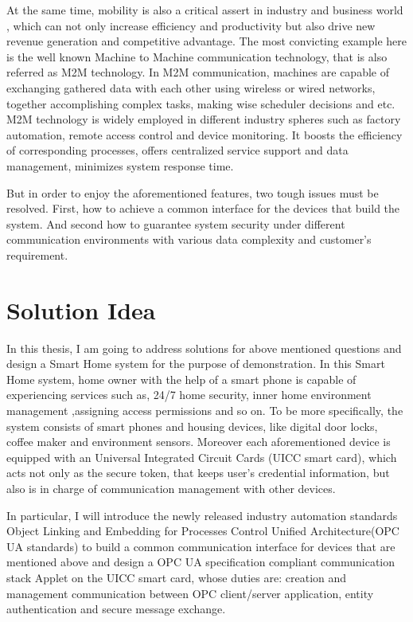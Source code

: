 At the same time, mobility is also a critical assert in industry and business world , which can not only increase efficiency and productivity but also drive new revenue generation and competitive advantage. The most convicting example here is the well known Machine to Machine communication technology, that is also referred as M2M technology. In M2M communication, machines are capable of  exchanging gathered data with each other using wireless or wired networks, together accomplishing complex tasks, making wise scheduler decisions and etc. M2M technology is widely employed in different industry spheres such as factory automation, remote access control and device monitoring. It boosts the efficiency of corresponding processes, offers centralized service support and data management, minimizes system response time.

But in order to enjoy the aforementioned features, two tough issues must be resolved. First, how to achieve a common interface for the devices that build the system.  And second how to guarantee system security under different communication environments with various data complexity and customer's requirement.

\section{Solution Idea}\label{secSolutionIdea}
In this  thesis, I am going to address solutions for above mentioned questions and design a Smart Home system for the purpose of demonstration. In this Smart Home system, home owner with the help of a smart phone is capable of experiencing services such as, 24/7 home security, inner home environment management ,assigning access permissions and so on. To be more specifically, the system consists of smart phones and housing devices, like digital door locks, coffee maker and environment sensors. Moreover each aforementioned device is equipped with an Universal Integrated Circuit Cards (UICC smart card), which acts not only as the secure token, that keeps user's credential information, but also is in charge of communication management with other devices.

In particular, I will introduce the newly released industry automation standards Object Linking and Embedding for Processes Control Unified Architecture(OPC UA standards) to build a common communication interface for devices that are mentioned above and design a OPC UA specification compliant communication stack Applet on the UICC smart card, whose duties are: creation and management communication between OPC client/server application, entity authentication and secure message exchange.

